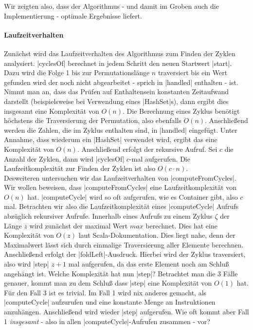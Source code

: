 Wir zeigten also, dass der Algorithmus - und damit im Groben auch die Implementierung - optimale Ergebnisse liefert.

\paragraph{Laufzeitverhalten}
Zunächst wird das Laufzeitverhalten des Algorithmus zum Finden der Zyklen analysiert.
|cyclesOf| berechnet in jedem Schritt den neuen Startwert |start|.
Dazu wird die Folge 1 bis zur Permutationslänge $n$ traversiert bis ein Wert gefunden wird der noch nicht abgearbeitet - sprich in |handled| enthalten - ist.
Nimmt man an, dass das Prüfen auf Enthaltensein konstanten Zeitaufwand darstellt (beispielsweise bei Verwendung eines |HashSet|s), dann ergibt dies insgesamt eine Komplexität von $O(n)$.
Die Berechnung eines Zyklus benötigt höchstens die Traversierung der Permutation, also ebenfalls $O(n)$. %
Anschließend werden die Zahlen, die im Zyklus enthalten sind, in |handled| eingefügt. Unter Annahme, dass wiederum ein |HashSet| verwendet wird, ergibt das eine Komplexität von $O(n)$.
Anschließend erfolgt der rekursive Aufruf. Sei $c$ die Anzahl der Zyklen, dann wird |cyclesOf| $c$-mal aufgerufen.
Die Laufzeitkomplexität zur Finden der Zyklen ist also $O(c \cdot n)$. \\
Desweiteren untersuchen wir das Laufzeitverhalten von |computeFromCycles|. Wir wollen beweisen, dass |computeFromCycles| eine Laufzeitkomplexität von $O(n)$ hat.
|computeCycle| wird so oft aufgerufen, wie es Container gibt, also $c$ mal.
Betrachten wir also die Laufzeitkomplexität eines |computeCycle| Aufrufs abzüglich rekursiver Aufrufe.
Innerhalb eines Aufrufs zu einem Zyklus $\zeta$ der Länge $z$ wird zunächst der maximal Wert $max$ berechnet.
Dies hat eine Komplexität von $O(z)$ laut Scala-Dokumentation. Dies liegt nahe, denn der Maximalwert lässt sich durch einmalige Traversierung aller Elemente berechnen.
Anschließend erfolgt der |foldLeft|-Ausdruck. Hierbei wird der Zyklus traversiert, also wird |step| $z+1$ mal aufgerufen, da das erste Element noch am Schluß angehängt ist.
Welche Komplexität hat nun |step|? Betrachtet man die 3 Fälle genauer, kommt man zu dem Schluß dass |step| eine Komplexität von $O(1)$ hat.
Für den Fall 3 ist es trivial. Im Fall 1 wird nix anderes gemacht, als |computeCycle| aufzurufen und eine konstante Menge an Instruktionen anzuhängen.
Anschließend wird wieder |step| aufgerufen. Wie oft kommt aber Fall 1 \emph{insgesamt} - also in allen |computeCycle|-Aufrufen zusammen - vor?
